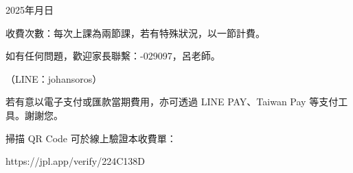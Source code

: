 \documentclass[a4paper]{article}
\begin{document}
\vspace{4mm}

{\large \hfill 2025年\quad\underline{\hspace{1.5cm}}\quad 月\quad\underline{\hspace{1.5cm}}\quad 日 \hspace{1cm}}

\newpage

\vspace*{5mm}

{\large 收費次數：每次上課為兩節課，若有特殊狀況，以一節計費。}

\vspace{3mm}

{\large 如有任何問題，歡迎家長聯繫：-029097，呂老師。}

\begin{flushright}
{\large （LINE：johansoros）}
\end{flushright}

\vspace{3mm}

{\large 若有意以電子支付或匯款當期費用，亦可透過 LINE PAY、Taiwan Pay 等支付工具。謝謝您。}

\vspace{10mm}

\begin{center}
掃描 QR Code 可於線上驗證本收費單：

\vspace{3mm}

\vspace{2mm}
{\small https://jpl.app/verify/224C138D}
\end{center}
\end{document}
